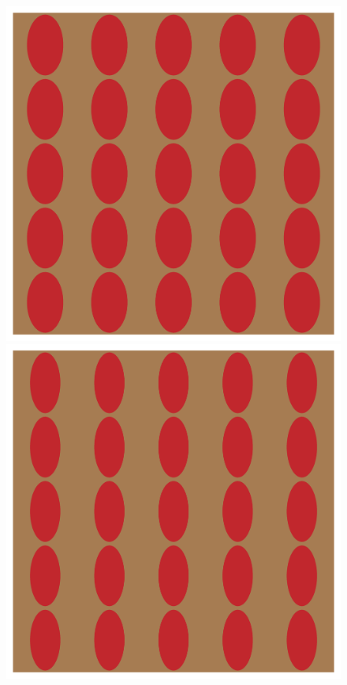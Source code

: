 \documentclass[a4paper,num-refs]{oup-contemporary}
\begin{document}
\begin{figure}
\begin{minipage}[b]{0.19\linewidth}
		\includegraphics[width=\linewidth]{test_mesh_axR_0.6.png}
	\end{minipage} 
	\begin{minipage}[b]{0.19\linewidth}
		\includegraphics[width=\linewidth]{test_mesh_axR_0.5.png}

\end{minipage}
\end{figure}
\end{document}

